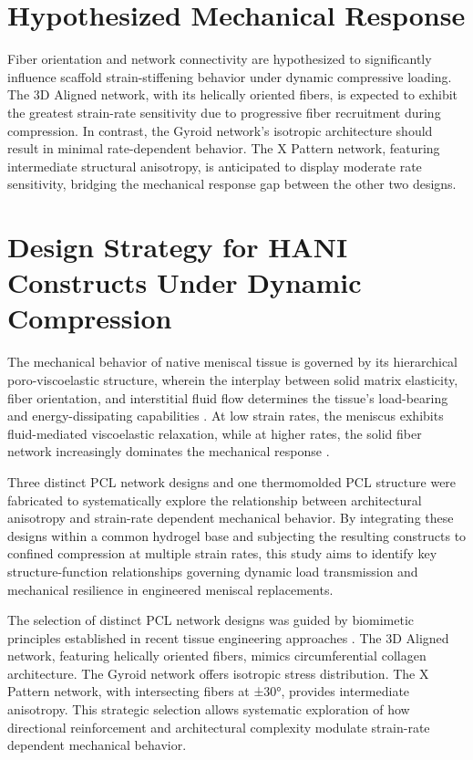 \section{Hypothesized Mechanical Response}
Fiber orientation and network connectivity are hypothesized to significantly influence scaffold strain-stiffening behavior under dynamic compressive loading. The 3D Aligned network, with its helically oriented fibers, is expected to exhibit the greatest strain-rate sensitivity due to progressive fiber recruitment during compression. In contrast, the Gyroid network's isotropic architecture should result in minimal rate-dependent behavior. The X Pattern network, featuring intermediate structural anisotropy, is anticipated to display moderate rate sensitivity, bridging the mechanical response gap between the other two designs.

\section{Design Strategy for HANI Constructs Under Dynamic Compression}

The mechanical behavior of native meniscal tissue is governed by its hierarchical poro-viscoelastic structure, wherein the interplay between solid matrix elasticity, fiber orientation, and interstitial fluid flow determines the tissue's load-bearing and energy-dissipating capabilities \cite{kleinhans2018hydraulicpermeability, morejon2020compressiveproperties}. At low strain rates, the meniscus exhibits fluid-mediated viscoelastic relaxation, while at higher rates, the solid fiber network increasingly dominates the mechanical response \cite{abdelgaied2015comparisonbiomechanical}.

Three distinct PCL network designs and one thermomolded PCL structure were fabricated to systematically explore the relationship between architectural anisotropy and strain-rate dependent mechanical behavior. By integrating these designs within a common hydrogel base and subjecting the resulting constructs to confined compression at multiple strain rates, this study aims to identify key structure-function relationships governing dynamic load transmission and mechanical resilience in engineered meniscal replacements.

The selection of distinct PCL network designs was guided by biomimetic principles established in recent tissue engineering approaches \cite{szojka2017biomimetic3d}. The 3D Aligned network, featuring helically oriented fibers, mimics circumferential collagen architecture. The Gyroid network offers isotropic stress distribution. The X Pattern network, with intersecting fibers at ±30°, provides intermediate anisotropy. This strategic selection allows systematic exploration of how directional reinforcement and architectural complexity modulate strain-rate dependent mechanical behavior.

